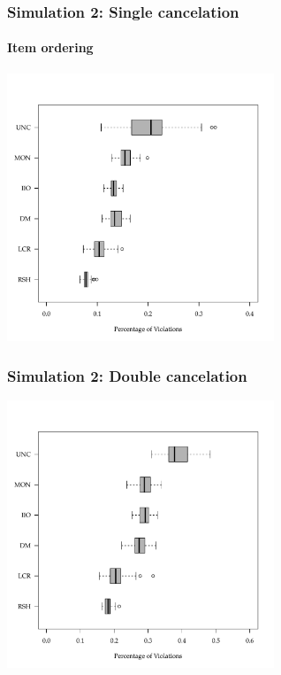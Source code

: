 \documentclass[10pt,serif,professionalfont]{beamer}
\begin{document}
\begin{frame}
    \frametitle{Simulation 2: Single cancelation}
        \framesubtitle{Item ordering}

    \centering \includegraphics[width=0.6\textwidth]{./figs/violations_rows_weighted.pdf}

\end{frame}

\begin{frame}
    \frametitle{Simulation 2: Double cancelation}

    \centering \includegraphics[width=0.6\textwidth]{./figs/violations_dc_weighted.pdf}

\end{frame}
\end{document}
